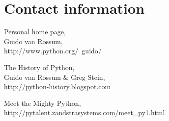 \documentclass[11pt]{scrartcl}
\begin{document}
\section{Contact information}

\begin{thebibliography}{9}

      Personal home page,\\
      Guido van Rossum,\\
      http://www.python.org/~guido/
    
        The History of Python,\\
        Guido van Rossum \& Greg Stein,\\
        http://python-history.blogspot.com

        Meet the Mighty Python,\\
        http://pytalent.zandstrasystems.com/meet\_py1.html
\end{thebibliography}
\end{document}
